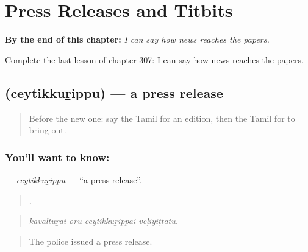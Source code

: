 
\chapter{Press Releases and Titbits}
\label{ch:ta-press-releases-and-titbits}

\begin{chapteropening}
\textbf{By the end of this chapter:} \emph{I can say how news reaches the papers.}

Complete the last lesson of chapter 307: I can say how news reaches the papers.
\end{chapteropening}

\section[\texorpdfstring{\ta{செய்திக்குறிப்பு} (ceytikkuṟippu)}{செய்திக்குறிப்பு (ceytikkuṟippu)}]{ (ceytikkuṟippu) — a press release}

\label{lesson:TA-C307-ceytikkurippu}



\begin{quote}
Before the new one: say the Tamil for an edition, then the Tamil for to bring out.
\end{quote}

\subsection*{You'll want to know: }
\textbf{} — \emph{ceytikkuṟippu} — \textquotedblleft{}a press release\textquotedblright{}.

\begin{quote}
   .
\end{quote}

\begin{quote}
\emph{kāvaltuṟai oru ceytikkuṟippai veḷiyiṭṭatu.}
\end{quote}

\begin{quote}
The police issued a press release.
\end{quote}

